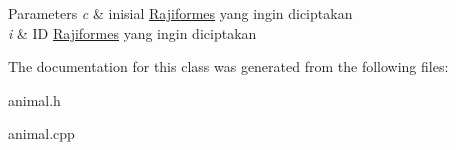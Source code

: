 \begin{DoxyParams}{Parameters}
{\em c} & inisial \hyperlink{classRajiformes}{Rajiformes} yang ingin diciptakan \\
\hline
{\em i} & ID \hyperlink{classRajiformes}{Rajiformes} yang ingin diciptakan \\
\hline
\end{DoxyParams}


The documentation for this class was generated from the following files\+:\begin{DoxyCompactItemize}
\item 
animal.\+h\item 
animal.\+cpp\end{DoxyCompactItemize}
